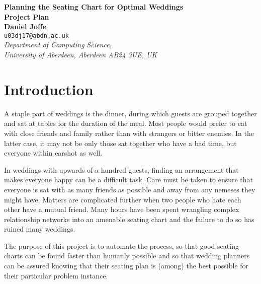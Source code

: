 \documentclass[a4paper,12pt]{article}
\begin{document}
\begin{center}
{\Large\bf{Planning the Seating Chart for Optimal Weddings}} \\
      \vspace{5.0mm}
{\Large\bf{Project Plan}} \\
      \vspace{8mm}
      {\large\bf{Daniel Joffe}}  \\
      \vspace{5.0mm}
       {\tt u03dj17@abdn.ac.uk} \\
      \vspace{5.0mm}
      {\em Department of Computing Science,\\
       University of Aberdeen, Aberdeen AB24 3UE, UK} 
\end{center}


\section*{Introduction}
\iffalse
This section should briefly describe the background to your
project and explain why your project is a worthwhile task.
You could add some references here, if appropriate, to cite 
relevant articles
\cite{wooldridge2002,shoham95} and \cite{garcia-camino2005}.
\fi

A staple part of weddings is the dinner, during which guests
are grouped together and sat at tables for the duration of
the meal. Most people would prefer to eat with close friends
and family rather than with strangers or bitter enemies. In
the latter case, it may not be only those sat together who have
a bad time, but everyone within earshot as well.

In weddings with upwards of a hundred guests, finding an
arrangement that makes everyone happy can be a difficult task.
Care must be taken to ensure that everyone is sat with as many
friends as possible and away from any nemeses they might have.
Matters are complicated further when two people who hate each
other have a mutual friend. Many hours have been spent wrangling
complex relationship networks into an amenable seating chart and
the failure to do so has ruined many weddings.

The purpose of this project is to automate the process, so that
good seating charts can be found faster than humanly possible and
so that wedding planners can be assured knowing that their seating
plan is (among) the best possible for their particular problem
instance.
\end{document}
